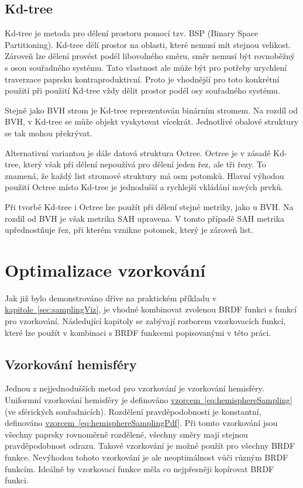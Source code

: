 \documentclass[czech,master]{diploma}
\begin{document}
\subsection{Kd-tree}
Kd-tree je metoda pro dělení prostoru pomocí tzv. BSP (Binary Space Partitioning). Kd-tree dělí prostor na oblasti, které nemusí mít stejnou velikost. Zároveň lze dělení provést podél libovolného směru, směr nemusí být rovnoběžný s osou souřadného systému. Tato vlastnost ale může být pro potřeby urychlení traverzace paprsku kontraproduktivní. Proto je vhodnější pro toto konkrétní použití při použití Kd-tree vždy dělit prostor podél osy souřadného systému.\par
Stejně jako BVH strom je Kd-tree reprezentován binárním stromem. Na rozdíl od BVH, v Kd-tree se může objekt vyskytovat vícekrát. Jednotlivé obalové struktury se tak mohou překrývat.\par
Alternativní variantou je dále datová struktura Octree. Octree je v zásadě Kd-tree, který však při dělení nepoužívá pro dělení jeden řez, ale tři řezy. To znamená, že každý list stromové struktury má osm potomků. Hlavní výhodou použití Octree místo Kd-tree je jednodušší a rychlejší vkládání nových prvků.\par
Při tvorbě Kd-tree i Octree lze použít při dělení stejné metriky, jako u BVH. Na rozdíl od BVH je však metrika SAH upravena. V tomto případě SAH metrika upřednostňuje řez, při kterém vznikne potomek, který je zároveň list.


\section{Optimalizace vzorkování}
Jak již bylo demonstrováno dříve na praktickém příkladu v \hyperref[sec:samplingViz]{kapitole~\ref{sec:samplingViz}}, je vhodné kombinovat zvolenou BRDF funkci s funkcí pro vzorkování. Následující kapitoly se zabývají rozborem vzorkovacích funkcí, které lze použít v kombinaci s BRDF funkcemi popisovanými v této práci.

\subsection{Vzorkování hemisféry} \label{sec:hemisphere}
Jednou z nejjednodušších metod pro vzorkování je vzorkování hemisféry. Uniformní vzorkování hemisféry je definováno \hyperref[eq:hemisphereSampling]{vzorcem~\ref{eq:hemisphereSampling}} (ve sférických souřadnicích). Rozdělení pravděpodobnosti je konstantní, definováno \hyperref[eq:hemisphereSamplingPdf]{vzorcem~\ref{eq:hemisphereSamplingPdf}}. Při tomto vzorkování jsou všechny paprsky rovnoměrně rozdělené, všechny směry mají stejnou pravděpodobnost odrazu. Takové vzorkování je možné použít pro všechny BRDF funkce. Nevýhodou tohoto vzorkování je ale neoptimálnost vůči různým BRDF funkcím. Ideálně by vzorkovací funkce měla co nejpřesněji kopírovat BRDF funkci.\par
\end{document}
